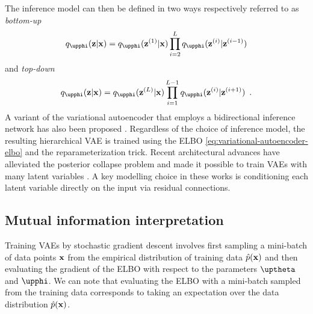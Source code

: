 The inference model can then be defined in two ways respectively referred to as \emph{bottom-up} \parencite{burda_importance_2016}
\begin{equation}
    q_\phib(\zb|\xb) = q_\phib(\zb^{(1)}|\xb)\prod_{i=2}^{L} q_\phib(\zb^{(i)}|\zb^{(i-1)})
\end{equation}
and \emph{top-down} \parencite{sonderby_ladder_2016}
\begin{equation}
    q_\phib(\zb|\xb) = q_\phib(\zb^{(L)}|\xb)\prod_{i=1}^{L-1} q_\phib(\zb^{(i)}|\zb^{(i+1)}) \enspace .
\end{equation}
A variant of the variational autoencoder that employs a bidirectional inference network has also been proposed \parencite{maaloe_biva_2019}. 
Regardless of the choice of inference model, the resulting hierarchical VAE is trained using the ELBO \cref{eq:variational-autoencoder-elbo} and the reparameterization trick. 
Recent architectural advances have alleviated the posterior collapse problem and made it possible to train VAEs with many latent variables \parencite{maaloe_biva_2019,vahdat_nvae_2020,child_very_2021}. A key modelling choice in these works is conditioning each latent variable directly on the input via residual connections. 




\subsection{Mutual information interpretation} \label{subsec: mutual-information-interpretation-of-elbo}
Training VAEs by stochastic gradient descent involves first sampling a mini-batch of data points ${\mathbf{x}}$ from the empirical distribution of training data $\hat{p}({\mathbf{x}})$ and then evaluating the gradient of the ELBO with respect to the parameters $\thetab$ and $\phib$. 
We can note that evaluating the ELBO with a mini-batch sampled from the training data corresponds to taking an expectation over the data distribution $\hat{p}({\mathbf{x}})$. 


